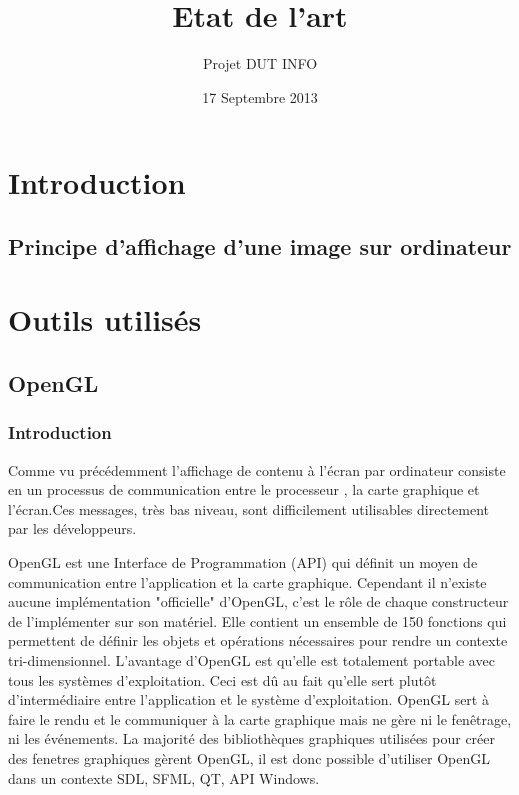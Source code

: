 \documentclass{report}
\title{Etat de l'art}
\author{Projet DUT INFO}
\date{17 Septembre 2013}
\begin{document}
\maketitle
\tableofcontents

\part{Introduction}



\chapter{Principe d'affichage d'une image sur ordinateur}
\part{Outils utilisés}

\chapter{OpenGL}

\section{Introduction}
Comme vu précédemment l'affichage de contenu à l'écran par ordinateur consiste en un processus de communication entre le processeur , la carte graphique et l'écran.Ces messages, très bas niveau, sont difficilement utilisables directement par les développeurs.

OpenGL est une Interface de Programmation (API) qui définit un moyen de communication entre l'application et la carte graphique.
Cependant il n'existe aucune implémentation "officielle" d'OpenGL, c'est le rôle de chaque constructeur de l'implémenter sur son matériel.  
Elle contient un ensemble de 150 fonctions qui permettent de définir les objets et opérations nécessaires pour rendre un contexte tri-dimensionnel.
L’avantage d'OpenGL est qu’elle est totalement portable avec tous les systèmes d'exploitation. Ceci est dû au fait qu'elle sert plutôt d'intermédiaire entre l'application et le système d'exploitation. OpenGL sert à faire le rendu et le communiquer à la carte graphique mais ne gère ni le fenêtrage, ni les événements. 
La majorité des bibliothèques graphiques utilisées pour créer des fenetres graphiques gèrent OpenGL, il est donc possible d'utiliser OpenGL dans un contexte SDL, SFML, QT, API Windows.

\end{document}
